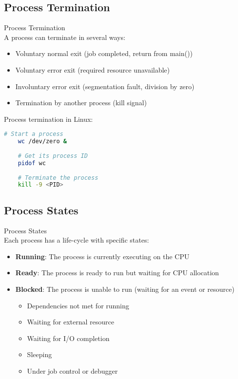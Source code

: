 \subsection{Process Termination}

\begin{definition}{Process Termination}\\
    A process can terminate in several ways:
    \begin{itemize}
        \item Voluntary normal exit (job completed, return from main())
        \item Voluntary error exit (required resource unavailable)
        \item Involuntary error exit (segmentation fault, division by zero)
        \item Termination by another process (kill signal)
    \end{itemize}
\end{definition}

\begin{example}
    Process termination in Linux:
    \begin{lstlisting}[language=bash, style=basesmol]
    # Start a process
    wc /dev/zero &
    
    # Get its process ID
    pidof wc
    
    # Terminate the process
    kill -9 <PID>
    \end{lstlisting}
\end{example}

\subsection{Process States}

\begin{definition}{Process States}\\
    Each process has a life-cycle with specific states:
    \begin{itemize}
        \item \textbf{Running}: The process is currently executing on the CPU
        \item \textbf{Ready}: The process is ready to run but waiting for CPU allocation
        \item \textbf{Blocked}: The process is unable to run (waiting for an event or resource)
            \begin{itemize}
                \item Dependencies not met for running
                \item Waiting for external resource
                \item Waiting for I/O completion
                \item Sleeping
                \item Under job control or debugger
            \end{itemize}
    \end{itemize}
\end{definition}

